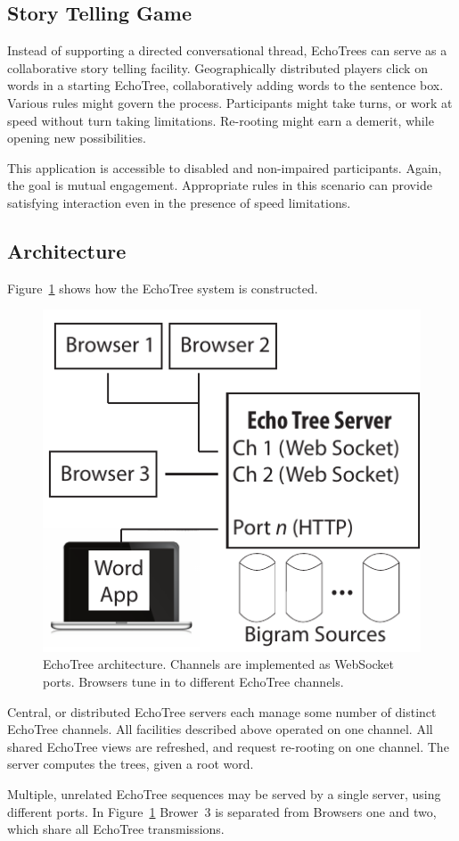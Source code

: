 \documentclass{sigchi}
\begin{document}
\subsection{Story Telling Game}
Instead of supporting a directed conversational thread, EchoTrees can
serve as a collaborative story telling facility. Geographically
distributed players click on words in a starting EchoTree,
collaboratively adding words to the sentence box. Various rules might
govern the process. Participants might take turns, or work at speed
without turn taking limitations. Re-rooting might earn a demerit,
while opening new possibilities.

This application is accessible to disabled and non-impaired
participants. Again, the goal is mutual engagement. Appropriate rules
in this scenario can provide satisfying interaction even in the
presence of speed limitations.

\subsection{Architecture}
Figure~\ref{fig:arch} shows how the EchoTree system is
constructed. 
\begin{figure}
   \centering
   \includegraphics[width=0.5\columnwidth]{Figs/echoTreeArch.pdf}
   \caption{EchoTree architecture. Channels are implemented as
     WebSocket ports. Browsers tune in to different EchoTree channels.}
   \label{fig:arch}
\end{figure}
Central, or distributed EchoTree servers each manage some
number of distinct EchoTree channels. All facilities described above
operated on one channel. All shared EchoTree views are refreshed, and
request re-rooting on one channel. The server computes the trees,
given a root word.

Multiple, unrelated EchoTree sequences may be served by a single
server, using different ports. In Figure~\ref{fig:arch}
Brower~3 is separated from Browsers one and two, which share all
EchoTree transmissions.
\end{document}
